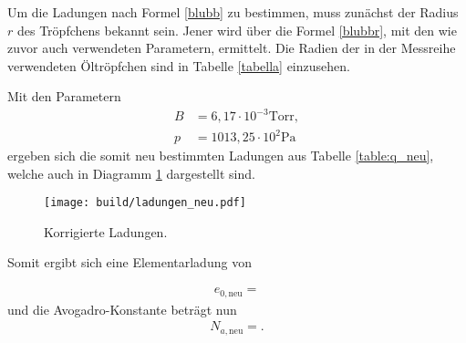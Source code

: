 Um die Ladungen nach Formel \eqref{blubb} zu bestimmen, muss zunächst der Radius $r$ des Tröpfchens bekannt sein.
Jener wird über die Formel \eqref{blubbr}, mit den wie zuvor auch verwendeten Parametern, ermittelt.
Die Radien der in der Messreihe verwendeten Öltröpfchen sind in Tabelle \ref{tabella} einzusehen.



Mit den Parametern \cite{skript} \cite{normaldruck}
\begin{align*}
  B &= 6,17\cdot 10^{-3}\text{Torr},\\
  p &= 1013,25\cdot10^2\si{\pascal}
\end{align*}
ergeben sich die somit neu bestimmten Ladungen aus Tabelle \ref{table:q_neu}, welche auch in Diagramm \ref{plot:2} dargestellt sind.




\begin{figure}
  \centering
  \texttt{[image: build/ladungen\_neu.pdf]}
  \caption{Korrigierte Ladungen.}
  \label{plot:2}
\end{figure}

Somit ergibt sich eine Elementarladung von

\begin{align*}
  e_{0,\text{neu}} = 
\end{align*}
und die Avogadro-Konstante beträgt nun
\begin{align*}
  N_{a,\text{neu}} = .
\end{align*}



